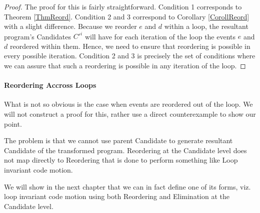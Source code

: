         \begin{proof}
        
            The proof for this is fairly straightforward. 
            Condition 1 corresponds to Theorem \ref{ThmReord}. 
            Condition 2 and 3 correspond to Corollary \ref{CorollReord} with a slight difference. Because we reorder $e$ and $d$ within a loop, the resultant program's Candidates $C'^i$ will have for each iteration of the loop the events $e$ and $d$ reordered within them. 
            Hence, we need to ensure that reordering is possible in every possible iteration. 
            Condition 2 and 3 is precisely the set of conditions where we can assure that such a reordering is possible in any iteration of the loop\footnotemark. 
            

        \end{proof}


        \paragraph{Reordering Accross Loops}
            What is not so obvious is the case when events are reordered out of the loop. We will not construct a proof for this, rather use a direct counterexample to show our point. 

            The problem is that we cannot use parent Candidate to generate resultant Candidate of the transformed program. Reordering at the Candidate level does not map directly to Reordering that is done to perform something like Loop invariant code motion. 

            We will show in the next chapter that we can in fact define one of its forms, viz. loop invariant code motion using both Reordering and Elimination at the Candidate level.
             
    